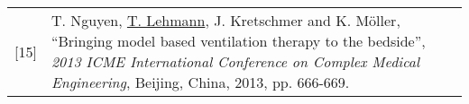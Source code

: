 \begin{cventries}
{\begin{longtable}{p{0.5cm} p{\textwidth - 0.5cm}}
        [15] & T. Nguyen, \underline{T. Lehmann}, J. Kretschmer and K. M\"{o}ller, ``Bringing model based ventilation therapy to the bedside'', \emph{2013 ICME International Conference on Complex Medical Engineering}, Beijing, China, 2013, pp. 666-669.
      \end{longtable}
    }
\end{cventries}
